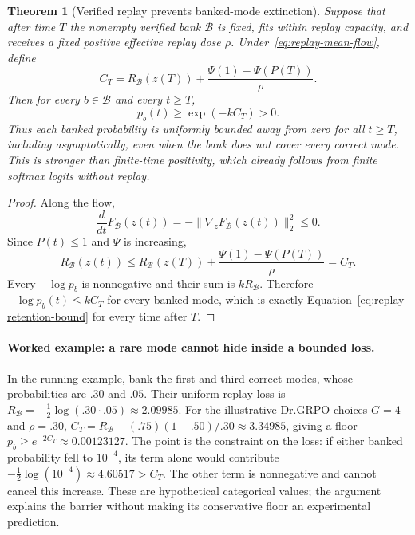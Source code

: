 \documentclass{article}
\newcommand{\1}{\mathbf 1}
\newtheorem{theorem}[lemma]{Theorem}
\theoremstyle{remark}
\theoremstyle{definition}
\theoremstyle{plain}
\begin{document}
\begin{theorem}[Verified replay prevents banked-mode extinction]
\label{thm:replay-retention}
Suppose that after time $T$ the nonempty verified bank $\mathcal B$ is fixed,
fits within replay capacity, and receives a fixed positive effective replay
dose $\rho$. Under~\eqref{eq:replay-mean-flow}, define
\[
  C_T
  =R_{\mathcal B}(z(T))
   +\frac{\Psi(1)-\Psi(P(T))}{\rho}.
\]
Then for every $b\in\mathcal B$ and every $t\ge T$,
\begin{equation}
  p_b(t)\ge \exp(-kC_T)>0.
  \label{eq:replay-retention-bound}
\end{equation}
Thus each banked probability is uniformly bounded away from zero for all
$t\ge T$, including asymptotically, even when the bank does not cover every
correct mode. This is stronger than finite-time positivity, which already
follows from finite softmax logits without replay.
\end{theorem}

\begin{proof}
Along the flow,
\[
  \frac{d}{dt}F_{\mathcal B}(z(t))
  =-\lVert\nabla_zF_{\mathcal B}(z(t))\rVert_2^2\le0.
\]
Since $P(t)\le1$ and $\Psi$ is increasing,
\[
  R_{\mathcal B}(z(t))
  \le R_{\mathcal B}(z(T))
     +\frac{\Psi(1)-\Psi(P(T))}{\rho}
  =C_T.
\]
Every $-\log p_b$ is nonnegative and their sum is
$kR_{\mathcal B}$. Therefore
$-\log p_b(t)\le kC_T$ for every banked mode, which is exactly
Equation~\eqref{eq:replay-retention-bound} for every time after $T$.
\end{proof}

\paragraph{Worked example: a rare mode cannot hide inside a bounded loss.}
In \hyperref[ex:theory-running]{the running example}, bank the first and third correct modes,
whose probabilities are $.30$ and $.05$. Their uniform replay loss is
$R_{\mathcal B}=-\tfrac12\log(.30\cdot.05)\approx2.09985$.
For the illustrative Dr.GRPO choices $G=4$ and $\rho=.30$,
$C_T=R_{\mathcal B}+(.75)(1-.50)/.30\approx3.34985$, giving a floor
$p_b\ge e^{-2C_T}\approx0.00123127$. The point is the constraint on the
loss: if either banked probability fell to $10^{-4}$, its term alone would
contribute $-\tfrac12\log(10^{-4})\approx4.60517>C_T$.
The other term is nonnegative and cannot cancel this increase. These are
hypothetical categorical values; the argument explains the barrier without
making its conservative floor an experimental prediction.
\end{document}
